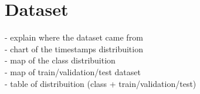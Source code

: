 \section{Dataset}
- explain where the dataset came from\\
- chart of the timestamps distribuition\\
- map of the class distribuition\\
- map of train/validation/test dataset\\
- table of distribuition (class + train/validation/test)\\
